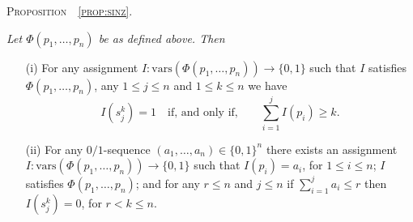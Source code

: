 \documentclass{article} \usepackage[utf8]{inputenc}
\newcommand*{\csf}{\ensuremath{{s}}}
\newcommand*{\Sinz}{\ensuremath{\Phi}}
\newcommand*{\vars}{\ensuremath{\mathrm{vars}}}
\begin{document}
\textsc{Proposition~~\ref{prop:sinz}. }
{\it
Let $\Sinz(p_1,\dots,p_n)$ be as defined above.  Then 
\begin{enumerate}
\item[(i)] For any assignment $I:\vars(\Sinz(p_1,\dots,p_n))\to\{0,1\}$ such that $I$ satisfies $ \Sinz(p_1,\dots,p_n)$,
any $1\leq j\leq n$ and $1\leq k\leq n$
we have 
$$
    I(\csf^k_j) = 1\quad \textrm{if, and only if,}\quad \quad\sum_{i=1}^j I(p_i) \geq k.
$$
\item[(ii)] For any $0/1$-sequence  $(a_1,\dots, a_n)\in\{0,1\}^n$ 
 there exists an assignment $I:\vars(\Sinz(p_1,\dots,p_n))\to \{0,1\}$ such that 
  $I(p_i) = a_i$, for $1\leq i \leq n$;
  $I$ satisfies $\Sinz(p_1,\dots,p_n)$; and 
  for any $r\leq n$ and $j\leq n$ if $\sum_{i=1}^j a_i \leq r$ then $I(\csf^k_j) = 0$, for $r<k\leq n$.
\end{enumerate}
}
\end{document}
